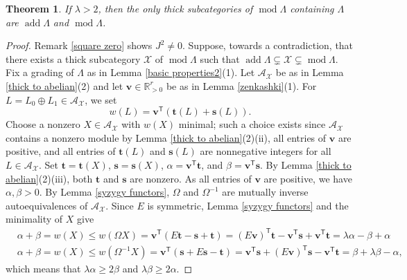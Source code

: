 \documentclass{amsart}
\newtheorem{thm}{Theorem}[section]
\theoremstyle{definition}
\theoremstyle{remark}
\numberwithin{equation}{thm}
\def\A{\mathcal{A}}
\def\add{\operatorname{add}}
\def\L{\Lambda}
\def\le{\leqslant}
\def\ge{\geqslant}
\def\mod{\operatorname{mod}}
\def\T{\mathsf{T}}
\def\X{\mathcal{X}}
\def\bfs{\mathbf{s}}
\def\bft{\mathbf{t}}
\def\bfv{\mathbf{v}}
\begin{document}
\begin{thm}\label{more than two}
If $\lambda>2$, then the only thick subcategories of $\mod\L$ containing $\L$ are $\add\L$ and $\mod\L$.
\end{thm}

\begin{proof}
Remark \ref{square zero} shows $J^2\ne 0$. Suppose, towards a contradiction, that there exists a thick subcategory $\X$ of $\mod\L$ such that $\add\L\subsetneq\X\subsetneq\mod\L$. Fix a grading of $\L$ as in Lemma \ref{basic properties2}(1). Let $\A_\X$ be as in Lemma \ref{thick to abelian}(2) and let $\bfv\in\mathbb{R}_{>0}^r$ be as in Lemma \ref{zenkashki}(1). For $L=L_0\oplus L_1\in\A_\X$, we set
$$
w(L)=\bfv^{\T}(\bft(L)+\bfs(L)).
$$
Choose a nonzero $X\in\A_\X$ with $w(X)$ minimal; such a choice exists since $\A_\X$ contains a nonzero module by Lemma \ref{thick to abelian}(2)(ii), all entries of $\bfv$ are positive, and all entries of $\bft(L)$ and $\bfs(L)$ are nonnegative integers for all $L\in\A_\X$. Set $\bft=\bft(X)$, $\bfs=\bfs(X)$, $\alpha=\bfv^{\T}\bft$, and $\beta=\bfv^{\T}\bfs$. By Lemma \ref{thick to abelian}(2)(iii), both $\bft$ and $\bfs$ are nonzero. As all entries of $\bfv$ are positive, we have $\alpha,\beta>0$. By Lemma \ref{syzygy functors},  $\Omega$ and $\Omega^{-1}$ are mutually inverse autoequivalences of $\A_\X$. Since $E$ is symmetric, Lemma \ref{syzygy functors} and the minimality of $X$ give
\begin{align*}
&\alpha+\beta=w(X)\le w(\Omega X)=\bfv^{\T}(E\bft-\bfs+\bft)=(E\bfv)^{\T}\bft-\bfv^{\T}\bfs+\bfv^{\T}\bft=\lambda\alpha-\beta+\alpha \\
&\alpha+\beta=w(X)\le w(\Omega^{-1}X)=\bfv^{\T}(\bfs+E\bfs-\bft)=\bfv^{\T}\bfs+(E\bfv)^{\T}\bfs-\bfv^{\T}\bft=\beta+\lambda\beta-\alpha,
\end{align*}
which means that $\lambda\alpha\ge2\beta$ and $\lambda\beta\ge2\alpha$.


\end{proof}
\end{document}
